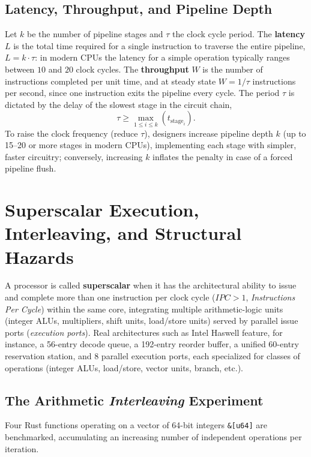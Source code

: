 \subsection{Latency, Throughput, and Pipeline Depth}

Let $k$ be the number of pipeline stages and $\tau$ the clock cycle period. The \textbf{latency} $L$ is the total time required for a single instruction to traverse the entire pipeline, $L = k \cdot \tau$: in modern CPUs the latency for a simple operation typically ranges between $10$ and $20$ clock cycles. The \textbf{throughput} $W$ is the number of instructions completed per unit time, and at steady state $W = 1/\tau$ instructions per second, since one instruction exits the pipeline every cycle. The period $\tau$ is dictated by the delay of the slowest stage in the circuit chain,
\[
\tau \ge \max_{1 \le i \le k} \left(t_{\text{stage}_i}\right).
\]
To raise the clock frequency (reduce $\tau$), designers increase pipeline depth $k$ (up to 15--20 or more stages in modern CPUs), implementing each stage with simpler, faster circuitry; conversely, increasing $k$ inflates the penalty in case of a forced pipeline flush.

\FloatBarrier
\section{Superscalar Execution, Interleaving, and Structural Hazards}

A processor is called \textbf{superscalar} when it has the architectural ability to issue and complete more than one instruction per clock cycle ($IPC > 1$, \textit{Instructions Per Cycle}) within the same core, integrating multiple arithmetic-logic units (integer ALUs, multipliers, shift units, load/store units) served by parallel issue ports (\textit{execution ports}). Real architectures such as Intel Haswell feature, for instance, a 56-entry decode queue, a 192-entry reorder buffer, a unified 60-entry reservation station, and 8 parallel execution ports, each specialized for classes of operations (integer ALUs, load/store, vector units, branch, etc.).

\subsection{The Arithmetic \textit{Interleaving} Experiment}

Four Rust functions operating on a vector of 64-bit integers \texttt{\&[u64]} are benchmarked, accumulating an increasing number of independent operations per iteration.

